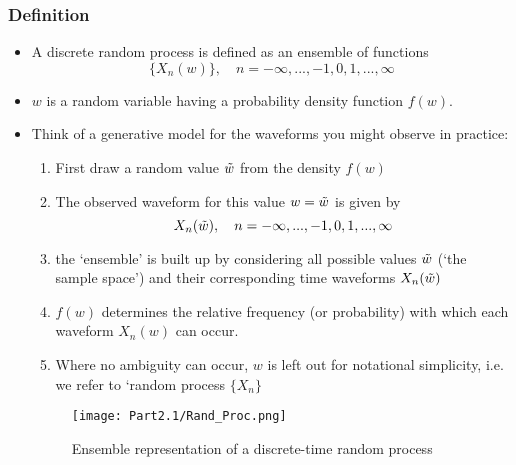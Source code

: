 \documentclass[12pt]{article}
\newcommand{\wtil}{\Tilde{w}}
\newcommand{\randpr}[1]{X_n(#1)}
\begin{document}
\subsubsection{Definition}
\begin{itemize}
    \item A discrete random process is defined as an ensemble of functions 
    \[
    \{ \randpr{w}\}, \quad n=-\infty,...,-1,0,1,...,\infty
    \]
    \item $w$ is a random variable having a probability density function $f(w)$.
    \item Think of a \textcolor{blue1}{generative} model for the waveforms you might observe in practice:
    \begin{enumerate}
        \item First draw a random value $\wtil$ from the density $f(w)$
        \item The observed waveform for this value $w = \wtil$ is given by 
        \[
        \randpr{\wtil}, \quad n = -\infty,...,-1,0,1,...,\infty
        \]
        \item the `ensemble' is built up by considering all possible values $\wtil$ (`the sample space') and their corresponding time waveforms $X_n(\wtil)$
        \item $f(w)$ determines the relative frequency (or probability) with which each waveform $X_n(w)$ can occur.
        \item Where no ambiguity can occur, $w$ is left out for notational simplicity, i.e. we refer to `random process $\{ X_n\}$ 
    \end{enumerate}
    \begin{figure}[H]
        \centering
        \texttt{[image: Part2.1/Rand\_Proc.png]}
        \caption{Ensemble representation of a discrete-time random process}
        \label{fig:ensemble_Rand}
    \end{figure}
\end{itemize}
\end{document}
